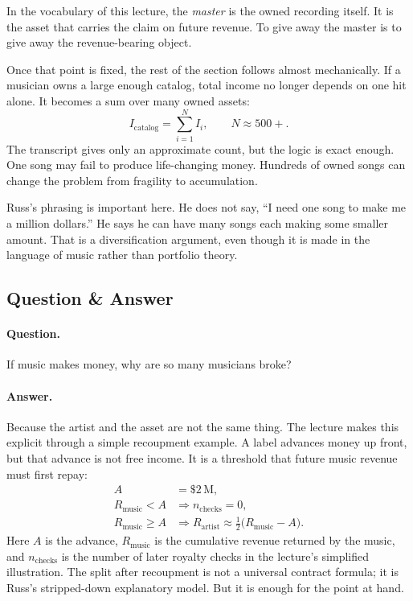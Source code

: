 \begin{definition}
In the vocabulary of this lecture, the \emph{master} is the owned recording itself. It is the asset that carries the claim on future revenue. To give away the master is to give away the revenue-bearing object.
\end{definition}

Once that point is fixed, the rest of the section follows almost mechanically. If a musician owns a large enough catalog, total income no longer depends on one hit alone. It becomes a sum over many owned assets:
\begin{equation}
I_{\mathrm{catalog}}=\sum_{i=1}^{N} I_i,\qquad N\approx 500+.
\end{equation}
The transcript gives only an approximate count, but the logic is exact enough. One song may fail to produce life-changing money. Hundreds of owned songs can change the problem from fragility to accumulation.

Russ's phrasing is important here. He does not say, ``I need one song to make me a million dollars.'' He says he can have many songs each making some smaller amount. That is a diversification argument, even though it is made in the language of music rather than portfolio theory.

\subsection{Question \& Answer}

\paragraph{Question.} If music makes money, why are so many musicians broke?

\paragraph{Answer.} Because the artist and the asset are not the same thing. The lecture makes this explicit through a simple recoupment example. A label advances money up front, but that advance is not free income. It is a threshold that future music revenue must first repay:
\begin{align}
A &= \$2\,\mathrm{M},\\
R_{\mathrm{music}}<A &\Longrightarrow n_{\mathrm{checks}}=0,\\
R_{\mathrm{music}}\ge A &\Longrightarrow R_{\mathrm{artist}}\approx \frac{1}{2}\bigl(R_{\mathrm{music}}-A\bigr).
\end{align}
Here \(A\) is the advance, \(R_{\mathrm{music}}\) is the cumulative revenue returned by the music, and \(n_{\mathrm{checks}}\) is the number of later royalty checks in the lecture's simplified illustration. The split after recoupment is not a universal contract formula; it is Russ's stripped-down explanatory model. But it is enough for the point at hand.

